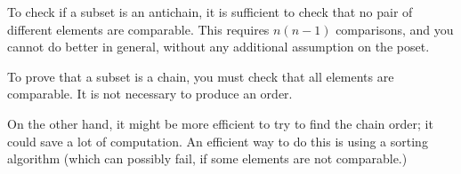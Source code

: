 
\begin{hint}
    To check if a subset is an antichain, it is sufficient to check that no pair of different elements are comparable.
    This requires $n(n-1)$ comparisons, and you cannot do better in general, without any additional assumption on the poset.
\end{hint}

\begin{hint}
    To prove that a subset is a chain, you must check that all elements are comparable. It is not necessary to produce an order.
\end{hint}
\begin{hint}
    On the other hand, it might be more efficient to try to find the chain order; it could save a lot of computation.
    An efficient way to do this is using a sorting algorithm (which can possibly fail, if some elements are not comparable.)
\end{hint}
